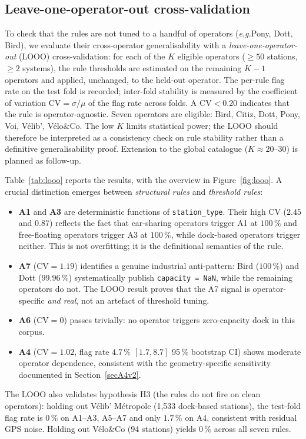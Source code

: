 \documentclass[11pt,a4paper]{article}
\newcommand{\eg}{\emph{e.g.}}
\begin{document}
\subsection{Leave-one-operator-out cross-validation}\label{secLOOO}
To check that the rules are not tuned to a handful of operators
(\eg Pony, Dott, Bird), we evaluate their cross-operator
generalisability with a \emph{leave-one-operator-out} (LOOO)
cross-validation: for each of the $K$ eligible operators
($\ge 50$ stations, $\ge 2$ systems), the rule thresholds are
estimated on the remaining $K-1$ operators and applied, unchanged,
to the held-out operator. The per-rule flag rate on the test fold
is recorded; inter-fold stability is measured by the coefficient of
variation $\mathrm{CV} = \sigma / \mu$ of the flag rate across folds.
A $\mathrm{CV} < 0.20$ indicates that the rule is operator-agnostic.
Seven operators are eligible: Bird, Citiz, Dott, Pony, Voi, V\'elib',
V\'elo\&Co. The low $K$ limits statistical power; the LOOO should
therefore be interpreted as a consistency check on rule stability
rather than a definitive generalisability proof. Extension to the
global catalogue ($K \approx 20$--$30$) is planned as follow-up.

Table~\ref{tab:looo} reports the results, with the overview in
Figure~\ref{fig:looo}. A crucial distinction
emerges between \emph{structural rules} and \emph{threshold rules}:
%
\begin{itemize}[nosep]
\item \textbf{A1} and \textbf{A3} are deterministic functions of
  \texttt{station\_type}. Their high CV ($2.45$ and $0.87$) reflects
  the fact that car-sharing operators trigger A1 at $100\,\%$ and
  free-floating operators trigger A3 at $100\,\%$, while dock-based
  operators trigger neither. This is not overfitting; it is the
  definitional semantics of the rule.
\item \textbf{A7} ($\mathrm{CV} = 1.19$) identifies a genuine
  industrial anti-pattern: Bird ($100\,\%$) and Dott ($99.96\,\%$)
  systematically publish \texttt{capacity = NaN}, while the
  remaining operators do not. The LOOO result proves that the A7
  signal is operator-specific \emph{and real}, not an artefact of
  threshold tuning.
\item \textbf{A6} ($\mathrm{CV} = 0$) passes trivially: no
  operator triggers zero-capacity dock in this corpus.
\item \textbf{A4} ($\mathrm{CV} = 1.02$, flag rate
  $4.7\,\%$ $[1.7, 8.7]$ 95\,\% bootstrap CI) shows moderate
  operator dependence, consistent with the geometry-specific
  sensitivity documented in Section~\ref{secA4v2}.
\end{itemize}
%
The LOOO also validates hypothesis H3 (the rules do not fire on
clean operators): holding out V\'elib' M\'etropole (1{,}533
dock-based stations), the test-fold flag rate is $0\,\%$ on A1--A3,
A5--A7 and only $1.7\,\%$ on A4, consistent with residual GPS noise.
Holding out V\'elo\&Co (94 stations) yields $0\,\%$ across all
seven rules.
\end{document}
